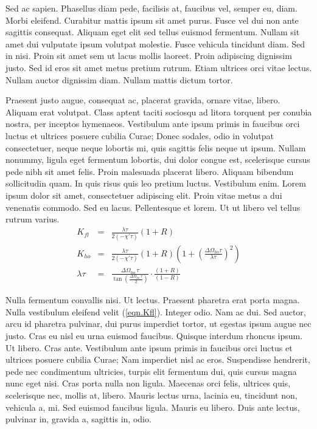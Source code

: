 \documentclass[nochapterpage,bigchapter,linedtoc,longdoc,colorback,accentcolor=tud4c]{tudreport}
\newif\ifTUDmargin\TUDmarginfalse
\begin{document}
    Sed ac sapien. Phasellus diam pede, facilisis at, faucibus vel, semper eu, diam. Morbi eleifend. Curabitur mattis ipsum sit amet purus. Fusce vel dui non ante sagittis consequat. Aliquam eget elit sed tellus euismod fermentum. Nullam sit amet dui vulputate ipsum volutpat molestie. Fusce vehicula tincidunt diam. Sed in nisi. Proin sit amet sem ut lacus mollis laoreet. Proin adipiscing dignissim justo. Sed id eros sit amet metus pretium rutrum. Etiam ultrices orci vitae lectus. Nullam auctor dignissim diam. Nullam mattis dictum tortor.

    Praesent justo augue, consequat ac, placerat gravida, ornare vitae, libero. Aliquam erat volutpat. Class aptent taciti sociosqu ad litora torquent per conubia nostra, per inceptos hymenaeos. Vestibulum ante ipsum primis in faucibus orci luctus et ultrices posuere cubilia Curae; Donec sodales, odio in volutpat consectetuer, neque neque lobortis mi, quis sagittis felis neque ut ipsum. Nullam nonummy, ligula eget fermentum lobortis, dui dolor congue est, scelerisque cursus pede nibh sit amet felis. Proin malesuada placerat libero. Aliquam bibendum sollicitudin quam. In quis risus quis leo pretium luctus. Vestibulum enim. Lorem ipsum dolor sit amet, consectetuer adipiscing elit. Proin vitae metus a dui venenatis commodo. Sed eu lacus. Pellentesque et lorem. Ut ut libero vel tellus rutrum varius.
			\begin{eqnarray}
				K_{fl}&=&\frac{\lambda\tau}{2(-\chi'\tau)}(1+R)\label{eqn.Kfl}\\
				K_{ho}&=&\frac{\lambda\tau}{2(-\chi'\tau)}(1+R)
					\left(1+\left(\frac{\Delta\Omega_{ho}\tau}{\lambda\tau}\right)^2\right)
					\label{eqn.Kho}\\
				\lambda\tau&=&
					\frac{\Delta\Omega_{ho}\,\tau}{\tan\left(\frac{\Delta\Omega_{ho}\,\tau}{2}
					\right)}\cdot\frac{(1+R)}{(1-R)}\label{eqn.lambda}
			\end{eqnarray}

    Nulla fermentum convallis nisi.%
    \ifTUDmargin%
      \marginpar{Nulla fermentum convallis nisi. Ut lectus. Praesent pharetra erat porta magna.}%
    \fi%
    Ut lectus. Praesent pharetra erat porta magna. Nulla vestibulum eleifend velit (\ref{eqn.Kfl}). Integer odio. Nam ac dui. Sed auctor, arcu id pharetra pulvinar, dui purus imperdiet tortor, ut egestas ipsum augue nec justo. Cras eu nisl eu urna euismod faucibus. Quisque interdum rhoncus ipsum. Ut libero. Cras ante. Vestibulum ante ipsum primis in faucibus orci luctus et ultrices posuere cubilia Curae; Nam imperdiet nisl ac eros. Suspendisse hendrerit, pede nec condimentum ultricies, turpis elit fermentum dui, quis cursus magna nunc eget nisi. Cras porta nulla non ligula. Maecenas orci felis, ultrices quis, scelerisque nec, mollis at, libero. Mauris lectus urna, lacinia eu, tincidunt non, vehicula a, mi. Sed euismod faucibus ligula. Mauris eu libero. Duis ante lectus, pulvinar in, gravida a, sagittis in, odio.
    
\end{document}
